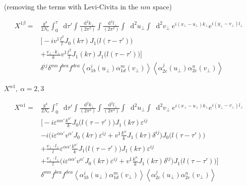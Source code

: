 \documentclass[12pt]{article}
\newcommand*\diff{\mathop{}\!\mathrm{d}}
\begin{document}
(removing the terms with Levi-Civita in the $nm$ space)

\begin{equation*}
\begin{split}
 X^{1 \beta} = &
\frac{g^4}{2 N_c}
\int_0^\tau \diff \tau'
\int \frac{\diff^2 k_\perp}{(2\pi^2)}
\int \frac{\diff^2 l_\perp}{(2\pi^2)}
\int \diff^2 u_\perp
\int \diff^2 v_\perp ~
e^{i (x_\perp - u_\perp) k_\perp}
e^{i (y_\perp - v_\perp) l_\perp} \\
& \bigg[ - i v^1 \frac{l^\beta}{l} J_0(k \tau) J_1\big(l(\tau-\tau') \big)    \\
& + \frac{v_\perp \cdot k_\perp}{k}  v^1 \frac{l^\beta}{l} J_1 (k\tau) J_1\big(l(\tau-\tau') \big)  \bigg]\\
& \delta^{ij} \delta^{mn} f^{bca} f^{dea}
\left< \alpha^i_{1b} (u_\perp) \alpha^m_{1d} (v_\perp) \right>  \left< \alpha^j_{2c} (u_\perp) \alpha^n_{2e} (v_\perp) \right>
\end{split}
\end{equation*}

\newpage

$X^{\alpha 1}, ~\alpha=2,3$

\begin{equation*}
\begin{split}
 X^{\alpha 1} = &
\frac{g^4}{2 N_c}
\int_0^\tau \diff \tau'
\int \frac{\diff^2 k_\perp}{(2\pi^2)}
\int \frac{\diff^2 l_\perp}{(2\pi^2)}
\int \diff^2 u_\perp
\int \diff^2 v_\perp ~
e^{i (x_\perp - u_\perp) k_\perp}
e^{i (y_\perp - v_\perp) l_\perp} \\
& \bigg[ - i \varepsilon^{\alpha \alpha'} \frac{k^{\alpha'}}{k} J_0\big(l (\tau-\tau')\big) J_1(k \tau) \varepsilon^{ij}  \\
& - i \Big(i \varepsilon^{\alpha \alpha'} v^{\alpha'} J_0(k \tau) \varepsilon^{ij} + v^1 \frac{k^\alpha}{k} J_1(k \tau) \delta^{ij} \Big) J_0\big(l(\tau-\tau')\big)  \\
& + \frac{v_\perp \cdot l_\perp}{l} \varepsilon^{\alpha \alpha'} \frac{k^{\alpha'}}{k} J_1\big(l(\tau-\tau')\big) J_1(k\tau) \varepsilon^{ij}  \\
& + \frac{v_\perp \cdot l_\perp}{l} \Big( i \varepsilon^{\alpha \alpha'} v^{\alpha'} J_0 (k\tau) \varepsilon^{ij} + v^1 \frac{k^\alpha}{k} J_1(k\tau) \delta^{ij} \Big) J_1\big(l(\tau-\tau')\big)  \bigg]\\
& \delta^{mn}  f^{bca} f^{dea}
\left< \alpha^i_{1b} (u_\perp) \alpha^m_{1d} (v_\perp) \right>  \left< \alpha^j_{2c} (u_\perp) \alpha^n_{2e} (v_\perp) \right>
\end{split}
\end{equation*}
\end{document}
